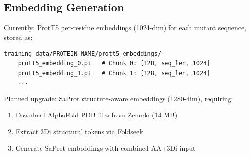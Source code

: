 \subsection{Embedding Generation}

Currently: ProtT5 per-residue embeddings (1024-dim) for each mutant sequence, stored as:
\begin{verbatim}
training_data/PROTEIN_NAME/prott5_embeddings/
    prott5_embedding_0.pt   # Chunk 0: [128, seq_len, 1024]
    prott5_embedding_1.pt   # Chunk 1: [128, seq_len, 1024]
    ...
\end{verbatim}

Planned upgrade: SaProt structure-aware embeddings (1280-dim), requiring:
\begin{enumerate}
    \item Download AlphaFold PDB files from Zenodo (14 MB)
    \item Extract 3Di structural tokens via Foldseek
    \item Generate SaProt embeddings with combined AA+3Di input
\end{enumerate}
